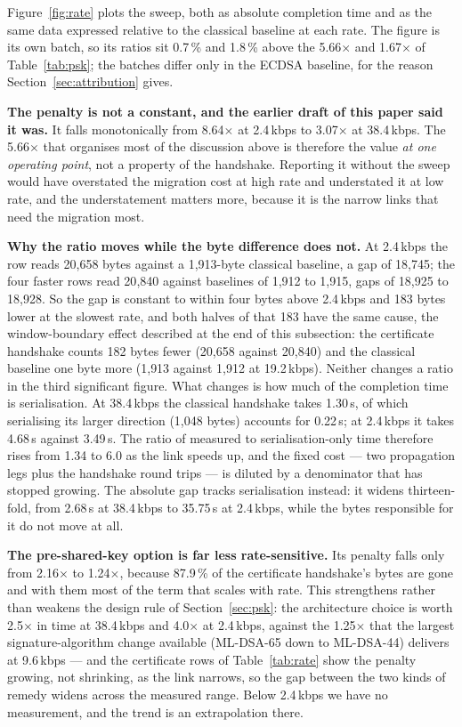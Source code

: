 \documentclass[drones,article,submit,pdftex,moreauthors]{Definitions/mdpi}
\newcommand{\kbps}{kbps}
\newcommand{\mldsa}{ML-DSA}
\begin{document}
Figure~\ref{fig:rate} plots the sweep, both as absolute completion time
and as the same data expressed relative to the classical baseline at each
rate. The figure is its own batch, so its ratios sit 0.7\,\% and
1.8\,\% above the 5.66$\times$ and 1.67$\times$ of
Table~\ref{tab:psk}; the batches differ only in the ECDSA baseline, for
the reason Section~\ref{sec:attribution} gives.

\textbf{The penalty is not a constant, and the earlier draft of this
paper said it was.} It falls monotonically from 8.64$\times$ at
2.4\,\kbps{} to 3.07$\times$ at 38.4\,\kbps{}. The 5.66$\times$ that
organises most of the discussion above is therefore the value \emph{at
one operating point}, not a property of the handshake. Reporting it
without the sweep would have overstated the migration cost at high rate
and understated it at low rate, and the understatement matters more,
because it is the narrow links that need the migration most.

\textbf{Why the ratio moves while the byte difference does not.} At
2.4\,\kbps{} the row reads 20{,}658 bytes against a 1{,}913-byte
classical baseline, a gap of 18{,}745; the four faster rows read 20{,}840
against baselines of 1{,}912 to 1{,}915, gaps of 18{,}925 to 18{,}928.
So the gap is constant to within four bytes above 2.4\,\kbps{} and 183
bytes lower at the slowest rate, and both halves of that 183 have the
same cause, the window-boundary effect described at the end of this
subsection: the certificate handshake counts 182 bytes fewer (20{,}658
against 20{,}840) and the classical baseline one byte more (1{,}913
against 1{,}912 at 19.2\,\kbps{}). Neither changes a ratio in the third
significant figure. What changes is how much of the
completion time is serialisation. At 38.4\,\kbps{} the
classical handshake takes 1.30\,s, of which serialising its larger
direction (1{,}048 bytes) accounts for 0.22\,s; at 2.4\,\kbps{} it
takes 4.68\,s against 3.49\,s. The ratio of measured to
serialisation-only time therefore rises from 1.34 to 6.0 as the link
speeds up, and the fixed cost --- two propagation legs plus the
handshake round trips --- is diluted by a denominator that has stopped
growing. The absolute gap tracks serialisation instead: it widens
thirteen-fold, from 2.68\,s at 38.4\,\kbps{} to 35.75\,s at
2.4\,\kbps{}, while the bytes responsible for it do not move at all.

\textbf{The pre-shared-key option is far less rate-sensitive.} Its
penalty falls only from 2.16$\times$ to 1.24$\times$, because 87.9\,\%
of the certificate handshake's bytes are gone and with them most of the
term that scales with rate. This strengthens rather than weakens the
design rule of Section~\ref{sec:psk}: the architecture choice is worth
2.5$\times$ in time at 38.4\,\kbps{} and 4.0$\times$ at 2.4\,\kbps{},
against the 1.25$\times$ that the largest signature-algorithm change
available (\mldsa{}-65 down to \mldsa{}-44) delivers at 9.6\,\kbps{}
--- and the certificate rows of Table~\ref{tab:rate} show the penalty
growing, not shrinking, as the link narrows, so the gap between the two
kinds of remedy widens across the measured range. Below 2.4\,\kbps{} we
have no measurement, and the trend is an extrapolation there.
\end{document}
